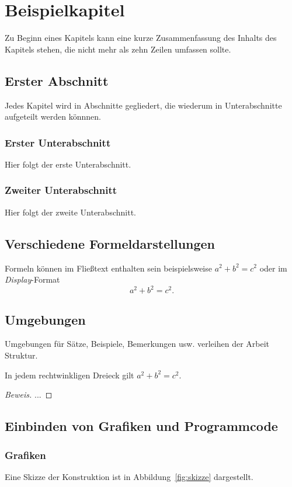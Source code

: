 \chapter{Beispielkapitel}
Zu Beginn eines Kapitels kann eine kurze Zusammenfassung des
Inhalts des Kapitels stehen, die nicht mehr als zehn Zeilen
umfassen sollte. 

\section{Erster Abschnitt}
Jedes Kapitel wird in Abschnitte gegliedert, die wiederum
in Unterabschnitte aufgeteilt werden k\"onnnen. 

\subsection{Erster Unterabschnitt}
Hier folgt der erste Unterabschnitt.

\subsection{Zweiter Unterabschnitt}
Hier folgt der zweite Unterabschnitt.

\section{Verschiedene Formeldarstellungen}
Formeln k\"onnen im Flie\ss text enthalten sein beispielsweise
$a^2+b^2=c^2$ oder im {\em Display}-Format
\[
a^2 + b^2 = c^2.
\]

\section{Umgebungen}
Umgebungen f\"ur S\"atze, Beispiele, Bemerkungen usw. verleihen
der Arbeit Struktur. 

\begin{satz}\label{satz:pythagoras}
In jedem rechtwinkligen Dreieck gilt $a^2+b^2=c^2$. 
\end{satz}

\begin{proof}[Beweis]
...
\end{proof}

\section{Einbinden von Grafiken und Programmcode}

\subsection{Grafiken} 
Eine Skizze der Konstruktion ist in Abbildung~\ref{fig:skizze}
dargestellt. 

